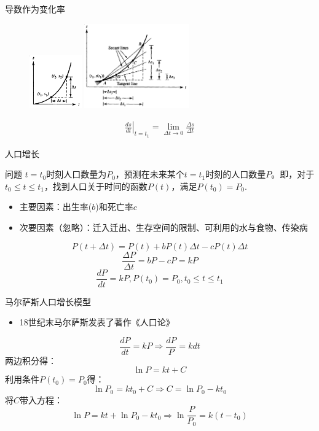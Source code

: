 \documentclass[UTF8]{ctexbeamer}
\begin{document}
\begin{frame}{导数作为变化率}
  \begin{figure}
    \centering
    \includegraphics[width=0.2\textwidth]{dis.png}
    \includegraphics[width=0.4\textwidth]{slope.png}
  \end{figure}
  
  \[
  \begin{array}{c}
    \left.\frac{ds}{dt}\right|_{t=t_1}=\lim_{\Delta t \rightarrow 0}\frac{\Delta s}{\Delta t}
  \end{array}
  \]
\end{frame}

\begin{frame}{人口增长}
  \begin{block}{问题}
    $t = t_0$时刻人口数量为$P_0$，预测在未来某个$t=t_1$时刻的人口数量$P$。即，对于$t_0 \le t \le t_1$，找到人口关于时间的函数$P(t)$，满足$P(t_0)=P_0$.
  \end{block}
  \begin{itemize}
  \item 主要因素：出生率($b$)和死亡率$c$
  \item 次要因素（忽略）：迁入迁出、生存空间的限制、可利用的水与食物、传染病
  \end{itemize}
  \[
  P(t+\Delta t) = P(t) + bP(t)\Delta t - cP(t)\Delta t
  \]
  \[
  \frac{\Delta P}{\Delta t} = bP - cP = kP
  \]
  \[
  \frac{dP}{dt} = kP, P(t_0)=P_0, t_0 \le t \le t_1
  \]
\end{frame}

\begin{frame}{马尔萨斯人口增长模型}
  \begin{itemize}
  \item 18世纪末马尔萨斯发表了著作《人口论》
  \end{itemize}

  \[
  \frac{dP}{dt} = kP \Rightarrow \frac{dP}{P} = kdt
  \]
  两边积分得：
  \[
  \ln P = kt + C
  \]
  利用条件$P(t_0) = P_0$得：
  \[
  \ln P_0 = kt_0 + C \Rightarrow C = \ln P_0 - kt_0
  \]
  将$C$带入方程：
  \[
  \ln P = kt + \ln P_0 - kt_0 \Rightarrow \ln\frac{P}{P_0} = k(t-t_0)
  \]
  
  
\end{frame}
\end{document}
